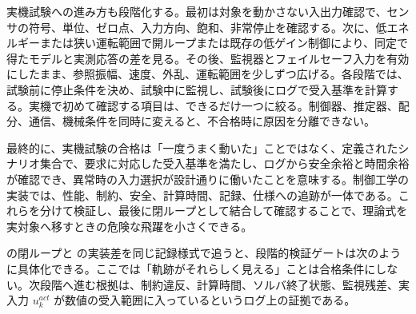 実機試験への進み方も段階化する。最初は対象を動かさない入出力確認で、センサの符号、単位、ゼロ点、入力方向、飽和、非常停止を確認する。次に、低エネルギーまたは狭い運転範囲で開ループまたは既存の低ゲイン制御により、同定で得たモデルと実測応答の差を見る。その後、監視器とフェイルセーフ入力を有効にしたまま、参照振幅、速度、外乱、運転範囲を少しずつ広げる。各段階では、試験前に停止条件を決め、試験中に監視し、試験後にログで受入基準を計算する。実機で初めて確認する項目は、できるだけ一つに絞る。制御器、推定器、配分、通信、機械条件を同時に変えると、不合格時に原因を分離できない。

最終的に、実機試験の合格は「一度うまく動いた」ことではなく、定義されたシナリオ集合で、要求に対応した受入基準を満たし、ログから安全余裕と時間余裕が確認でき、異常時の入力選択が設計通りに働いたことを意味する。制御工学の実装では、性能、制約、安全、計算時間、記録、仕様への追跡が一体である。これらを分けて検証し、最後に閉ループとして結合して確認することで、理論式を実対象へ移すときの危険な飛躍を小さくできる。

 の閉ループと  の実装差を同じ記録様式で追うと、段階的検証ゲートは次のように具体化できる。ここでは「軌跡がそれらしく見える」ことは合格条件にしない。次段階へ進む根拠は、制約違反、計算時間、ソルバ終了状態、監視残差、実入力 $u_k^{act}$ が数値の受入範囲に入っているというログ上の証拠である。

